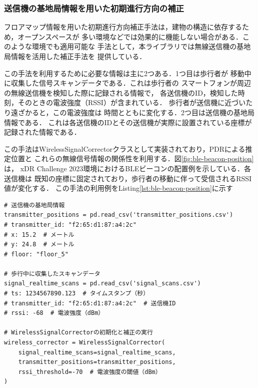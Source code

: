 
\subsubsection{送信機の基地局情報を用いた初期進行方向の補正}

フロアマップ情報を用いた初期進行方向補正手法は，建物の構造に依存するため，オープンスペースが
多い環境などでは効果的に機能しない場合がある．このような環境でも適用可能な
手法として，本ライブラリでは無線送信機の基地局情報を活用した補正手法を
提供している．

この手法を利用するために必要な情報は主に2つある．1つ目は歩行者が
移動中に収集した信号スキャンデータである．これは歩行者の
スマートフォンが周辺の無線送信機を検知した際に記録される情報で，
各送信機のID，検知した時刻，そのときの電波強度（RSSI）が含まれている．
歩行者が送信機に近づいたり遠ざかると，この電波強度は
時間とともに変化する．2つ目は送信機の基地局情報である．
これは各送信機のIDとその送信機が実際に設置されている座標が
記録された情報である．

この手法はWirelessSignalCorrectorクラスとして実装されており，PDRによる推定位置と
これらの無線信号情報の関係性を利用する．図\ref{fig:ble-beacon-position}は，
xDR Challenge 2023環境におけるBLEビーコンの配置例を示している．各送信機は
既知の座標に固定されており，歩行者の移動に伴って受信されるRSSI値が変化する．
この手法の利用例をListing\ref{lst:ble-beacon-position}に示す

\begin{lstlisting}[caption={WirelessSignalCorrectorの使用例},label=lst:ble-beacon-position,float=h]
# 送信機の基地局情報
transmitter_positions = pd.read_csv('transmitter_positions.csv')
# transmitter_id: "f2:65:d1:87:a4:2c"
# x: 15.2  # メートル
# y: 24.8  # メートル
# floor: "floor_5"

# 歩行中に収集したスキャンデータ
signal_realtime_scans = pd.read_csv('signal_scans.csv')
# ts: 1234567890.123  # タイムスタンプ（秒）
# transmitter_id: "f2:65:d1:87:a4:2c"  # 送信機ID
# rssi: -68  # 電波強度（dBm）

# WirelessSignalCorrectorの初期化と補正の実行
wireless_corrector = WirelessSignalCorrector(
    signal_realtime_scans=signal_realtime_scans,
    transmitter_positions=transmitter_positions,
    rssi_threshold=-70  # 電波強度の閾値（dBm）
)
\end{lstlisting}

